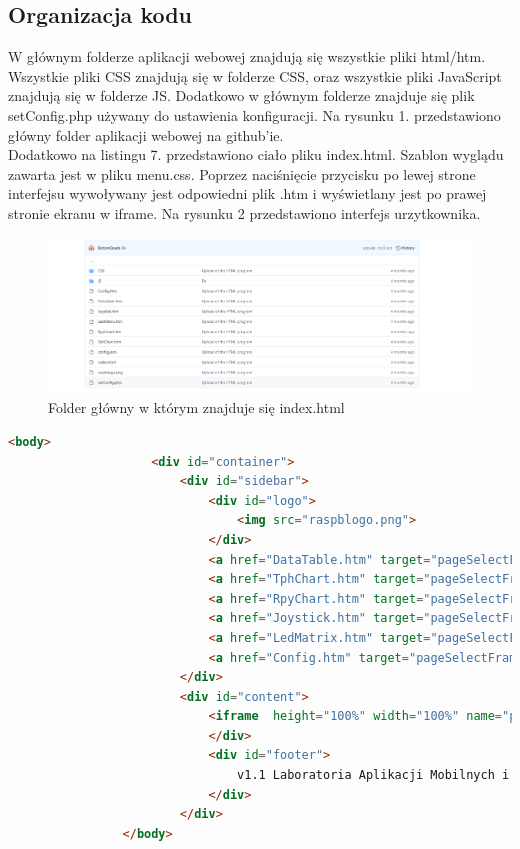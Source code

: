 \documentclass{article}
\begin{document}
			\subsection{Organizacja kodu}
				W głównym folderze aplikacji webowej znajdują się wszystkie pliki html/htm. Wszystkie pliki CSS znajdują się w folderze CSS, oraz wszystkie pliki JavaScript znajdują się w folderze JS. Dodatkowo w głównym folderze znajduje się plik setConfig.php używany do ustawienia konfiguracji. Na rysunku 1. przedstawiono główny folder aplikacji webowej na github'ie.\\
				Dodatkowo na listingu 7. przedstawiono ciało pliku index.html. Szablon wyglądu zawarta jest w pliku menu.css. Poprzez naciśnięcie przycisku po lewej strone interfejsu wywoływany jest odpowiedni plik .htm i wyświetlany jest po prawej stronie ekranu w iframe.
				Na rysunku 2 przedstawiono interfejs urzytkownika.
				\begin{figure}[!h]
					\includegraphics[width=\textwidth]{webTree}
					\caption{Folder główny w którym znajduje się index.html}
				\end{figure}
				\begin{lstlisting}[caption={Kod Body plikeu index.html}, language=html, firstnumber=27]
				<body>
					<div id="container">
						<div id="sidebar">
							<div id="logo">
								<img src="raspblogo.png">
							</div>
							<a href="DataTable.htm" target="pageSelectFrame"><div class="menuOption"> Data Table </div></a>
							<a href="TphChart.htm" target="pageSelectFrame"><div class="menuOption"> T/P/H Charts </div></a>
							<a href="RpyChart.htm" target="pageSelectFrame"><div class="menuOption"> R/P/Y Charts </div></a>
							<a href="Joystick.htm" target="pageSelectFrame"><div class="menuOption"> Joystick Position </div></a>
							<a href="LedMatrix.htm" target="pageSelectFrame"><div class="menuOption"> Led Controller </div></a>
							<a href="Config.htm" target="pageSelectFrame"><div class="menuOption"> Config </div></a>
						</div>
						<div id="content">
							<iframe  height="100%" width="100%" name="pageSelectFrame"></iframe>
							</div>
							<div id="footer">
								v1.1 Laboratoria Aplikacji Mobilnych i Wbudowanych dla Internetu przedmiotu
							</div>
						</div>
				</body>
				\end{lstlisting}
\end{document}
